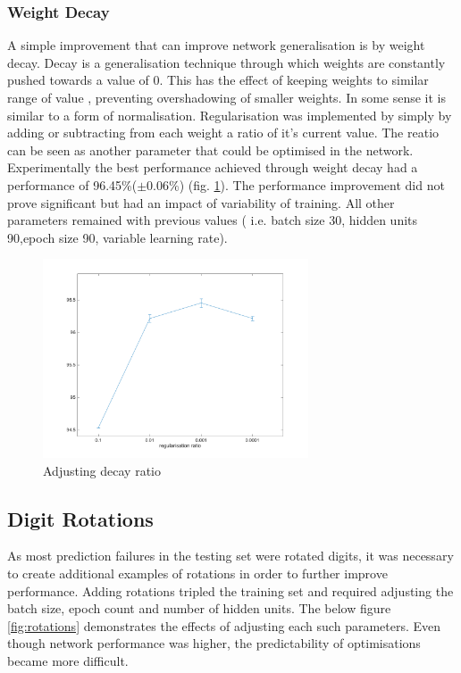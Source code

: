 \documentclass[11]{article}
\begin{document}
\subsubsection{Weight Decay}
A simple improvement that can improve network generalisation is by weight decay. Decay is a generalisation technique through which weights are constantly pushed towards a value of 0. This has the effect of keeping weights to similar range of value , preventing overshadowing of smaller weights. In some sense it is similar to a form of normalisation.
Regularisation was implemented by simply by adding or subtracting from each weight a ratio of it's current value. The reatio can be seen as another parameter that could be optimised in the network. Experimentally the best performance achieved through weight decay had a performance of 96.45\%($\pm 0.06\%$) (fig. \ref{fig:regularisation}). The performance improvement did not prove significant but had an impact of variability of training. All other parameters remained with previous values ( i.e. batch size 30, hidden units 90,epoch size 90, variable learning rate).

\begin{figure}[h]
\centering
\includegraphics[width=0.7\textwidth]{regularisation.png}
\caption{Adjusting decay ratio}
\label{fig:regularisation}
\end{figure}

\subsection{Digit Rotations}
As most prediction failures in the testing set were rotated digits, it was necessary to create additional examples of rotations in order to further improve performance. Adding rotations tripled the training set and required adjusting the batch size, epoch count and number of hidden units. The below figure \ref{fig:rotations} demonstrates the effects of adjusting each such parameters. Even though network performance was higher, the predictability of optimisations became more difficult. 
\end{document}
